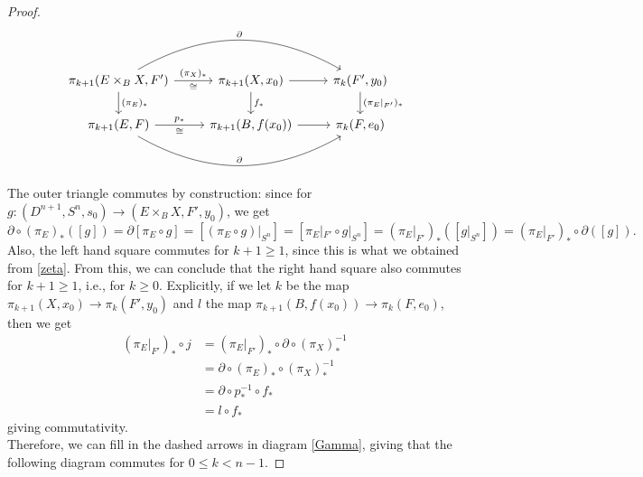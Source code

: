 \documentclass[reqno]{amsart}
\theoremstyle{definition}
\theoremstyle{remark}
\begin{document}
\begin{proof}
        \begin{equation*}
        \begin{tikzcd}
            \pi_{k+1}(E \times_B X, F') \ar[r, "(\pi_X)_*",
            "\cong"']
            \ar[rr, bend left, "\partial"] 
            \ar[d, "(\pi_E)_*"]& 
            \pi_{k+1}(X,x_0) \ar[r] \ar[d, "f_*"]&
            \pi_k(F',y_0) \ar[d, "(\pi_E|_{F'})_*"] \\
            \pi_{k+1}(E, F) \ar[r, "p_*", "\cong"']
            \ar[rr, bend right,
            "\partial"] &
            \pi_{k+1}(B, f(x_0)) \ar[r] &
            \pi_k (F,e_0)
        \end{tikzcd}
        \end{equation*}
        The outer triangle commutes by construction:
        since for $g \colon
        \left( D^{n+1}, S^{n}, s_0 \right) 
        \to \left( E \times_B X, F', y_0 \right) $,
        we get
        \[
          \partial \circ
          \left( \pi_E \right)_*
          \left( \left[ g \right]  \right) 
          =\partial \left[ \pi_E \circ g \right] 
        = \left[ \left( \pi_E \circ g \right)|_{S^{n}} \right] 
        = \left[ \pi_E|_{F'} \circ g|_{S^{n}} \right]
        = \left( \pi_E|_{F'} \right)_*
        \left( \left[ g|_{S^{n}} \right]  \right) 
        = \left( \pi_E|_{F'} \right)_*
    \circ \partial \left( \left[ g \right]  \right).
\]
Also, the left hand square commutes for $k+1\ge 1$, since
this is what we obtained from \eqref{zeta}.
From this, we can conclude that the right hand square
also commutes for $k+1\ge 1$, i.e., for $k\ge 0$.
Explicitly, if we let
$k$ be the map
$\pi_{k+1}(X,x_0) \to \pi_{k}(F',y_0)$ and
$l$ the map
$\pi_{k+1}(B,f(x_0)) \to \pi_k (F,e_0)$, then we
get
\begin{align*}
    (\pi_E|_{F'})_* \circ j
    &= (\pi_E|_{F'})_* \circ \partial \circ
    \left( \pi_X \right)_*^{-1}\\
    &= \partial \circ (\pi_E)_* \circ (\pi_X)_*^{-1}\\
    &= \partial \circ p_*^{-1} \circ f_*\\
    &= l \circ f_*
\end{align*}
giving commutativity.\\
        

        Therefore, we can fill in the dashed arrows
        in diagram \eqref{Gamma}, giving that the
        following diagram commutes
        for $0\le k < n-1$.


\end{proof}
\end{document}
